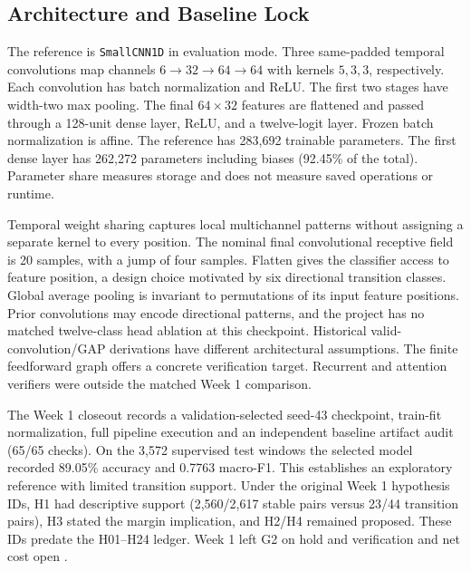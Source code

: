 \documentclass[journal]{IEEEtran}
\newcommand{\code}[1]{\nolinkurl{#1}}
\begin{document}
\subsection{Architecture and Baseline Lock}
The reference is \code{SmallCNN1D} in evaluation mode. Three same-padded temporal convolutions map channels $6\to32\to64\to64$ with kernels $5,3,3$, respectively. Each convolution has batch normalization and ReLU. The first two stages have width-two max pooling. The final $64\times32$ features are flattened and passed through a 128-unit dense layer, ReLU, and a twelve-logit layer. Frozen batch normalization is affine. The reference has 283,692 trainable parameters. The first dense layer has 262,272 parameters including biases (92.45\% of the total). Parameter share measures storage and does not measure saved operations or runtime.
\par
Temporal weight sharing captures local multichannel patterns without assigning a separate kernel to every position. The nominal final convolutional receptive field is 20 samples, with a jump of four samples. Flatten gives the classifier access to feature position, a design choice motivated by six directional transition classes. Global average pooling is invariant to permutations of its input feature positions. Prior convolutions may encode directional patterns, and the project has no matched twelve-class head ablation at this checkpoint. Historical valid-convolution/GAP derivations have different architectural assumptions. The finite feedforward graph offers a concrete verification target. Recurrent and attention verifiers were outside the matched Week 1 comparison.
\par
The Week 1 closeout records a validation-selected seed-43 checkpoint, train-fit normalization, full pipeline execution and an independent baseline artifact audit (65/65 checks). On the 3,572 supervised test windows the selected model recorded 89.05\% accuracy and 0.7763 macro-F1. This establishes an exploratory reference with limited transition support. Under the original Week 1 hypothesis IDs, H1 had descriptive support (2,560/2,617 stable pairs versus 23/44 transition pairs), H3 stated the margin implication, and H2/H4 remained proposed. These IDs predate the H01--H24 ledger. Week 1 left G2 on hold and verification and net cost open \cite{localw1}.
\end{document}
